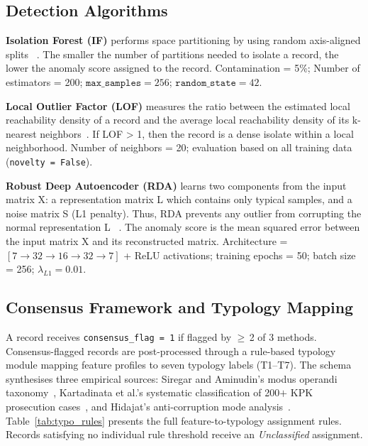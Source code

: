 \documentclass[3p,times,procedia]{elsarticle}
\begin{document}
\subsection{Detection Algorithms}

\textbf{Isolation Forest (IF)} performs space partitioning by using random axis-aligned splits ~\cite{ref24,ref25}. The smaller the number of partitions needed to isolate a record, the lower the anomaly score assigned to the record. Contamination = 5\%; Number of estimators = 200; $\texttt{max\_samples} = 256$; $\texttt{random\_state} = 42$.

\textbf{Local Outlier Factor (LOF)} measures the ratio between the estimated local reachability density of a record and the average local reachability density of its k-nearest neighbors~\cite{ref26}. If LOF > 1, then the record is a dense isolate within a local neighborhood. Number of neighbors = 20; evaluation based on all training data (\texttt{novelty = False}).

\textbf{Robust Deep Autoencoder (RDA)} learns two components from the input matrix X: a representation matrix L which contains only typical samples, and a noise matrix S (L1 penalty). Thus, RDA prevents any outlier from corrupting the normal representation L ~\cite{ref27}. The anomaly score is the mean squared error between the input matrix X and its reconstructed matrix. Architecture = $[7 \to 32 \to 16 \to 32 \to 7]$ + ReLU activations; training epochs = 50; batch size = 256; $\lambda_{L1} = 0.01$.

\subsection{Consensus Framework and Typology Mapping}

A record receives \texttt{consensus\_flag = 1} if flagged by $\geq$\,2 of 3 methods. Consensus-flagged records are post-processed through a rule-based typology module mapping feature profiles to seven typology labels (T1--T7). The schema synthesises three empirical sources: Siregar and Aminudin's modus operandi taxonomy~\cite{ref13}, Kartadinata et al.'s systematic classification of 200$+$ KPK prosecution cases~\cite{ref14}, and Hidajat's anti-corruption mode analysis~\cite{ref12}. Table~\ref{tab:typo_rules} presents the full feature-to-typology assignment rules. Records satisfying no individual rule threshold receive an \textit{Unclassified} assignment.
\end{document}
